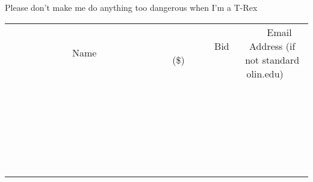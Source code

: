 \documentclass[11pt]{article}
\begin{document}
Please don't make me do anything too dangerous when I'm a T-Rex \\
					[6ex]
					\begin{tabular}{c c c}
						~~~~~~~~~~~~~Name~~~~~~~~~~~~~ & ~~~~~~~~~Bid (\$)~~~~~~~~~ & ~~~Email Address (if not standard olin.edu)~~~ \\
				
 & & \\
\hline
 & & \\
\hline
 & & \\
\hline
 & & \\
\hline
 & & \\
\hline
 & & \\
\hline
 & & \\
\hline
 & & \\
\hline
 & & \\
\hline
 & & \\
\hline
 & & \\
\hline
 & & \\
\hline
 & & \\
\hline
 & & \\
\hline
 & & \\
\hline
 & & \\
\hline
 & & \\
\hline
 & & \\
\hline
 & & \\
\hline
 & & \\
\hline
 & & \\
\hline
 & & \\
\hline
 & & \\
\hline
 & & \\
\hline
 & & \\
\hline
 & & \\
\hline
					\end{tabular}
					\clearpage
				
\end{document}
